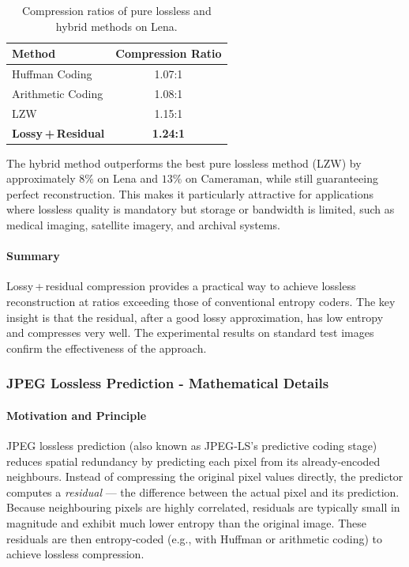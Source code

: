 \begin{table}[H]
\centering
\caption{Compression ratios of pure lossless and hybrid methods on Lena.}
\label{tab:comparison_pure}
\begin{tabular}{l c}
\hline
\textbf{Method} & \textbf{Compression Ratio} \\
\hline
Huffman Coding          & 1.07:1 \\
Arithmetic Coding       & 1.08:1 \\
LZW                     & 1.15:1 \\
\hline
\textbf{Lossy + Residual} & \textbf{1.24:1} \\
\hline
\end{tabular}
\end{table}

The hybrid method outperforms the best pure lossless method (LZW) by approximately \(8\%\) on Lena and \(13\%\) on Cameraman, while still guaranteeing perfect reconstruction. This makes it particularly attractive for applications where lossless quality is mandatory but storage or bandwidth is limited, such as medical imaging, satellite imagery, and archival systems.

\paragraph{Summary}
Lossy + residual compression provides a practical way to achieve lossless reconstruction at ratios exceeding those of conventional entropy coders. The key insight is that the residual, after a good lossy approximation, has low entropy and compresses very well. The experimental results on standard test images confirm the effectiveness of the approach.







\subsubsection{JPEG Lossless Prediction - Mathematical Details}

\paragraph{Motivation and Principle}
JPEG lossless prediction (also known as JPEG‑LS’s predictive coding stage) reduces spatial redundancy by predicting each pixel from its already‑encoded neighbours. Instead of compressing the original pixel values directly, the predictor computes a \emph{residual} — the difference between the actual pixel and its prediction. Because neighbouring pixels are highly correlated, residuals are typically small in magnitude and exhibit much lower entropy than the original image. These residuals are then entropy‑coded (e.g., with Huffman or arithmetic coding) to achieve lossless compression.

